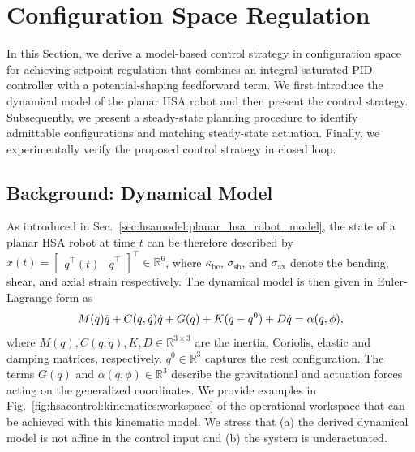 \section{Configuration Space Regulation}\label{sec:hsacontrol:configuration_space_regulation}
In this Section, we derive a model-based control strategy in configuration space for achieving setpoint regulation that combines an integral-saturated PID controller with a potential-shaping feedforward term. We first introduce the dynamical model of the planar \gls{HSA} robot and then present the control strategy.
Subsequently, we present a steady-state planning procedure to identify admittable configurations and matching steady-state actuation.
Finally, we experimentally verify the proposed control strategy in closed loop.

\subsection{Background: Dynamical Model}\label{sub:hsacontrol:model}
As introduced in Sec.~\ref{sec:hsamodel:planar_hsa_robot_model}, the state of a planar \gls{HSA} robot at time $t$ can be therefore described by $x(t) = \begin{bmatrix}
    q^\top(t) & \dot{q}^\top
\end{bmatrix}^\top \in \mathbb{R}^6$, where $\kappa_\mathrm{be}$, $\sigma_\mathrm{sh}$, and $\sigma_\mathrm{ax}$ denote the bending, shear, and axial strain respectively.
The dynamical model is then given in Euler-Lagrange form as
\begin{equation}\label{eq:hsacontrol:dynamics}
    M(q) \Ddot{q} + C(q,\dot{q})\dot{q} + G(q) + K (q - q^0) + D \dot{q} = \alpha(q,\phi),
\end{equation}
where $M(q),C(q,\dot{q}),K,D \in \mathbb{R}^{3 \times 3}$ are the inertia, Coriolis, elastic and damping matrices, respectively. $q^0 \in \mathbb{R}^3$ captures the rest configuration. The terms $G(q)$ and $\alpha(q,\phi) \in \mathbb{R}^3$ describe the gravitational and actuation forces acting on the generalized coordinates.
We provide examples in Fig.~\ref{fig:hsacontrol:kinematics:workspace} of the operational workspace that can be achieved with this kinematic model.
We stress that (a) the derived dynamical model is not affine in the control input and (b) the system is underactuated.

